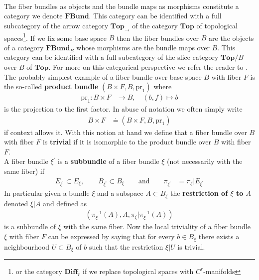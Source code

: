 \\
The fiber bundles as objects and the bundle maps as morphisms constitute a category we denote $\mathbf{FBund}$. This category can be identified with a full subcategory of the arrow category $\mathbf{Top}_{\to}$ of the category $\mathbf{Top}$ of topological spaces\footnote{or the category $\mathbf{Diff}_{r}$ if we replace topological spaces with $C^{r}$-manifolds}. If we fix some base space $B$ then the fiber bundles over $B$ are the objects of a category $\mathbf{FBund}_{B}$ whose morphisms are the bundle maps over $B$. This category can be identified with a full subcategory of the slice category $\mathbf{Top}/B$ over $B$ of $\mathbf{Top}$. For more on this categorical perspective we refer the reader to \cite{00000001}.
\\
The probably simplest example of a fiber bundle over base space $B$ with fiber $F$ is the so-called \textbf{product bundle} $(B \times F,B,\mathrm{pr}_{1})$ where
\begin{align*}
  \mathrm{pr}_{1}
  \colon
  B \times F
  &\to
  B
  ,\quad
  (b,f)
  \mapsto
  b
\end{align*}
is the projection to the first factor. In abuse of notation we often simply write
\begin{align*}
  B \times F
  &\doteq
  (B \times F,B,\mathrm{pr}_{1})
\end{align*}
if context allows it. With this notion at hand we define that a fiber bundle over $B$ with fiber $F$ is \textbf{trivial} if it is isomorphic to the product bundle over $B$ with fiber $F$.
\\
A fiber bundle $\xi^{\backprime}$ is a \textbf{subbundle} of a fiber bundle $\xi$ (not necessarily with the same fiber) if
\begin{align*}
  E_{\xi^{\backprime}}
  \subset
  E_{\xi}
  ,\qquad
  B_{\xi^{\backprime}}
  \subset
  B_{\xi}
  \qquad
  \text{and}
  \qquad
  \pi_{\xi^{\backprime}}
  &=
  \pi_{\xi}
  \vert
  E_{\xi^{\backprime}}
\end{align*}
In particular given a bundle $\xi$ and a subspace $A \subset B_{\xi}$ the \textbf{restriction of $\xi$ to $A$} denoted $\xi \vert A$ and defined as
\begin{align*}
  \left(
    \pi_{\xi}^{-1}(A)
    ,
    A
    ,
    \pi_{\xi}
    \vert
    \pi_{\xi}^{-1}(A)
  \right)
\end{align*}
is a subbundle of $\xi$ with the same fiber. Now the local triviality of a fiber bundle $\xi$ with fiber $F$ can be expressed by saying that for every $b \in B_{\xi}$ there exists a neighbourhood $U \subset B_{\xi}$ of $b$ such that the restriction $\xi \vert U$ is trivial.

